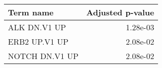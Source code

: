 \begin{tabular}{lr}
\toprule
     Term name &  Adjusted p-value \\
\midrule
  ALK DN.V1 UP &          1.28e-03 \\
 ERB2 UP.V1 UP &          2.08e-02 \\
NOTCH DN.V1 UP &          2.08e-02 \\
\bottomrule
\end{tabular}

